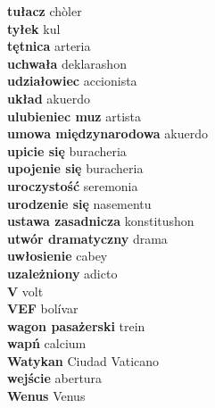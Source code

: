 \textbf{ tułacz  } chòler \\
\textbf{ tyłek  } kul \\
\textbf{ tętnica  } arteria \\
\textbf{ uchwała  } deklarashon \\
\textbf{ udziałowiec  } accionista \\
\textbf{ układ  } akuerdo \\
\textbf{ ulubieniec muz  } artista \\
\textbf{ umowa międzynarodowa  } akuerdo \\
\textbf{ upicie się  } buracheria \\
\textbf{ upojenie się  } buracheria \\
\textbf{ uroczystość  } seremonia \\
\textbf{ urodzenie się  } nasementu \\
\textbf{ ustawa zasadnicza  } konstitushon \\
\textbf{ utwór dramatyczny  } drama \\
\textbf{ uwłosienie  } cabey \\
\textbf{ uzależniony  } adicto \\
\textbf{ V  } volt \\
\textbf{ VEF  } bolívar \\
\textbf{ wagon pasażerski  } trein \\
\textbf{ wapń  } calcium \\
\textbf{ Watykan  } Ciudad Vaticano \\
\textbf{ wejście  } abertura \\
\textbf{ Wenus  } Venus \\
